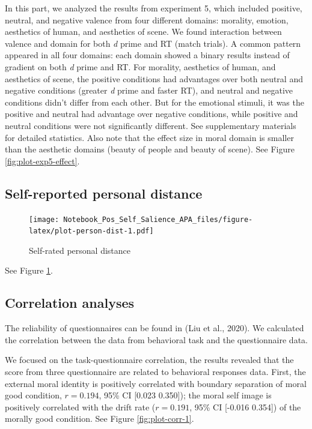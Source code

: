 \documentclass[
  english,
  man]{apa6}
\begin{document}
In this part, we analyzed the results from experiment 5, which included positive, neutral, and negative valence from four different domains: morality, emotion, aesthetics of human, and aesthetics of scene. We found interaction between valence and domain for both \emph{d} prime and RT (match trials). A common pattern appeared in all four domains: each domain showed a binary results instead of gradient on both \emph{d} prime and RT. For morality, aesthetics of human, and aesthetics of scene, the positive conditions had advantages over both neutral and negative conditions (greater \emph{d} prime and faster RT), and neutral and negative conditions didn't differ from each other. But for the emotional stimuli, it was the positive and neutral had advantage over negative conditions, while positive and neutral conditions were not significantly different. See supplementary materials for detailed statistics. Also note that the effect size in moral domain is smaller than the aesthetic domains (beauty of people and beauty of scene). See Figure \ref{fig:plot-exp5-effect}.

\hypertarget{self-reported-personal-distance}{%
\subsection{Self-reported personal distance}\label{self-reported-personal-distance}}

\begin{figure}
\centering
\texttt{[image: Notebook\_Pos\_Self\_Salience\_APA\_files/figure-latex/plot-person-dist-1.pdf]}
\caption{\label{fig:plot-person-dist}Self-rated personal distance}
\end{figure}

See Figure \ref{fig:plot-person-dist}.

\hypertarget{correlation-analyses}{%
\subsection{Correlation analyses}\label{correlation-analyses}}

The reliability of questionnaires can be found in (Liu et al., 2020). We calculated the correlation between the data from behavioral task and the questionnaire data.

We focused on the task-questionnaire correlation, the results revealed that the score from three questionnaire are related to behavioral responses data.
First, the external moral identity is positively correlated with boundary separation of moral good condition, \(r = 0.194\), 95\% CI {[}0.023 0.350{]}); the moral self image is positively correlated with the drift rate (\(r = 0.191\), 95\% CI {[}-0.016 0.354{]}) of the morally good condition. See Figure \ref{fig:plot-corr-1}.
\end{document}
